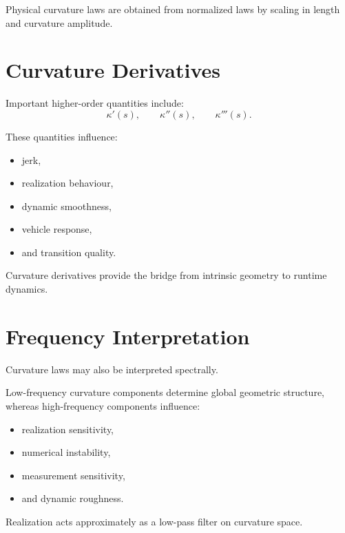 Physical curvature laws are obtained from normalized laws by scaling in
length and curvature amplitude.

\section{Curvature Derivatives}

\begin{definition}
\label{def:curvature-derivatives}
Important higher-order quantities include:
\[
\kappa'(s),
\qquad
\kappa''(s),
\qquad
\kappa'''(s).
\]
\end{definition}

These quantities influence:
\begin{itemize}
\item jerk,
\item realization behaviour,
\item dynamic smoothness,
\item vehicle response,
\item and transition quality.
\end{itemize}

Curvature derivatives provide the bridge from intrinsic geometry to
runtime dynamics.

\section{Frequency Interpretation}

Curvature laws may also be interpreted spectrally.

Low-frequency curvature components determine global geometric structure,
whereas high-frequency components influence:
\begin{itemize}
\item realization sensitivity,
\item numerical instability,
\item measurement sensitivity,
\item and dynamic roughness.
\end{itemize}

\begin{proposition}
\label{prop:spectral-realization-principle}
Realization acts approximately as a low-pass filter on curvature space.
\end{proposition}

